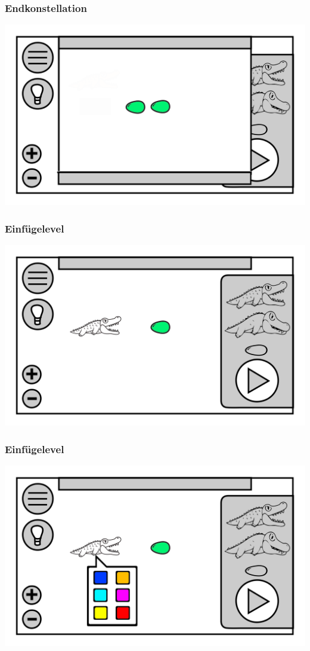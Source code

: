 \documentclass[t]{beamer}
\begin{document}
\begin{frame}
	\frametitle{Endkonstellation}
	\includegraphics[height=\textheight]{level_end.png}
\end{frame}
\begin{frame}
	\frametitle{Einfügelevel}
	\includegraphics[height=\textheight]{level_croc.png}
\end{frame}
\begin{frame}
	\frametitle{Einfügelevel}
	\includegraphics[height=\textheight]{level_color_purple.png}
\end{frame}
\end{document}
